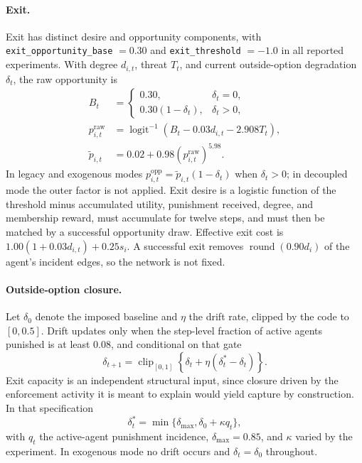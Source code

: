 \documentclass[12pt]{article}
\begin{document}
\paragraph{Exit.} Exit has distinct desire and opportunity components, with
\texttt{exit\_opportunity\_base} \(=0.30\) and \texttt{exit\_threshold}
\(=-1.0\) in all reported experiments. With degree \(d_{i,t}\), threat \(T_t\),
and current outside-option degradation \(\delta_t\), the raw opportunity is
\begin{align}
 B_t&=\begin{cases}0.30,&\delta_t=0,\\0.30(1-\delta_t),&\delta_t>0,\end{cases}\\
 p^{\mathrm{raw}}_{i,t}&=\operatorname{logit}^{-1}(B_t-0.03d_{i,t}-2.908T_t),\\
 \widetilde p_{i,t}&=0.02+0.98\left(p^{\mathrm{raw}}_{i,t}\right)^{5.98}.
\end{align}
In legacy and exogenous modes \(p^{\mathrm{opp}}_{i,t}=\widetilde
p_{i,t}(1-\delta_t)\) when \(\delta_t>0\); in decoupled mode the outer factor is
not applied. Exit desire is a logistic function of the threshold minus
accumulated utility, punishment received, degree, and membership reward, must
accumulate for twelve steps, and must then be matched by a successful
opportunity draw. Effective exit cost is \(1.00(1+0.03d_{i,t})+0.25s_i\). A
successful exit removes \(\operatorname{round}(0.90d_i)\) of the agent's
incident edges, so the network is not fixed.

\paragraph{Outside-option closure.} Let \(\delta_0\) denote the imposed baseline
and \(\eta\) the drift rate, clipped by the code to \([0,0.5]\). Drift updates
only when the step-level fraction of active agents punished is at least 0.08,
and conditional on that gate
\begin{equation}
 \delta_{t+1}=\operatorname{clip}_{[0,1]}\left\{\delta_t+\eta(\delta_t^{*}-\delta_t)\right\}.
\end{equation}
Exit capacity is an independent structural input, since closure driven by the
enforcement activity it is meant to explain would yield capture by construction.
In that specification
\begin{equation}
 \delta_t^{*}=\min\{\delta_{\max},\delta_0+\kappa q_t\},
\end{equation}
with \(q_t\) the active-agent punishment incidence, \(\delta_{\max}=0.85\), and
\(\kappa\) varied by the experiment. In exogenous mode no drift occurs and
\(\delta_t=\delta_0\) throughout.
\end{document}
